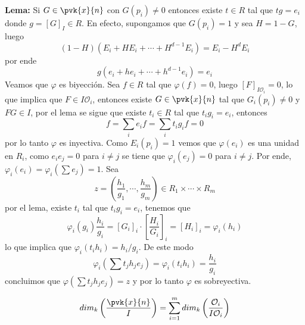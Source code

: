 \documentclass{article}
\begin{document}
\begin{dem}
    \vspace{4mm}
    \noindent \textbf{Lema:} Si $G\in\pvk{x}{n}$ con $G(p_{i})\neq0$ entonces
    existe $t\in R$ tal que $tg=e_{i}$ donde $g=[G]_{I}\in R$. En efecto, supongamos que 
    $G(p_{i})=1$ y sea $H=1-G$, luego
    \begin{equation*}
        (1-H)(E_{i}+HE_{i}+\cdots+H^{d-1}E_{i})=E_{i}-H^{d}E_{i}
    \end{equation*}
    por ende
    \begin{equation*}
        g(e_{i}+he_{i}+\cdots+h^{d-1}e_{i})=e_{i}
    \end{equation*}
    Veamos que $\varphi$ es biyección. Sea $f\in R$ tal que $\varphi(f)=0$, luego 
    $[F]_{I\mathcal{O}_{i}}=0$, lo que implica que $F\in I\mathcal{O}_{i}$, entonces existe 
    $G\in\pvk{x}{n}$ tal que $G_{i}(p_{i})\neq0$ y $FG\in I$, por el lema se sigue que existe 
    $t_{i}\in R$ tal que $t_{i}g_{i}=e_{i}$, entonces
    \begin{equation*}
        f=\sum_{i}e_{i}f=\sum_{i}t_{i}g_{i}f=0
    \end{equation*}
    por lo tanto $\varphi$ es inyectiva. Como $E_{i}(p_{i})=1$ vemos que $\varphi(e_{i})$ es una
    unidad en $R_{i}$, como $e_{i}e_{j}=0$ para $i\neq j$ se tiene que $\varphi_{i}(e_{j})=0$ para
    $i\neq j$. Por ende, $\varphi_{i}(e_{i})=\varphi_{i}(\sum e_{j})=1$. Sea
    \begin{equation*}
        z=\left(\frac{h_{1}}{g_{1}},\cdots,\frac{h_{m}}{g_{m}}\right)\in R_{1}
        \times\cdots\times R_{m}
    \end{equation*}
    por el lema, existe $t_{i}$ tal que $t_{i}g_{i}=e_{i}$, tenemos que
    \begin{equation*}
        \varphi_{i}(g_{i})\frac{h_{i}}{g_{i}}=[G_{i}]_{i}\cdot\left[\frac{H_{i}}{G_{i}}\right]_{i}
        =[H_{i}]_{i}=\varphi_{i}(h_{i})
    \end{equation*}
    lo que implica que $\varphi_{i}(t_{i}h_{i})=h_{i}/g_{i}$. De este modo
    \begin{equation*}
        \varphi_{i}\left(\sum t_{j}h_{j}e_{j}\right)=\varphi_{i}(t_{i}h_{i})=\frac{h_{i}}{g_{i}}
    \end{equation*}
    concluimos que $\varphi(\sum t_{j}h_{j}e_{j})=z$ y por lo tanto $\varphi$ es sobreyectiva.
\end{dem}
\begin{cor}
    \begin{equation*}
        dim_{k}\left(\frac{\pvk{x}{n}}{I}\right)=
        \sum_{i=1}^{m}dim_{k}\left(\frac{\mathcal{O}_{i}}{I\mathcal{O}_{i}}\right)
    \end{equation*}
\end{cor}
\end{document}
